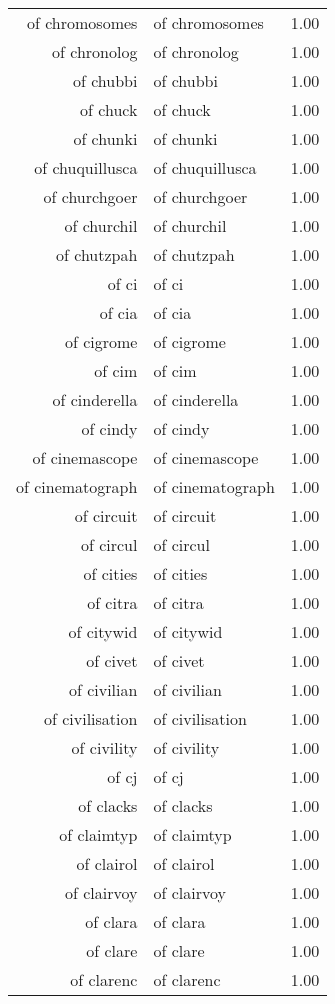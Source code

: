 \begin{table}[ht]
\begin{tabular}{rlr}
  of chromosomes & of chromosomes & 1.00 \\ 
  of chronolog & of chronolog & 1.00 \\ 
  of chubbi & of chubbi & 1.00 \\ 
  of chuck & of chuck & 1.00 \\ 
  of chunki & of chunki & 1.00 \\ 
  of chuquillusca & of chuquillusca & 1.00 \\ 
  of churchgoer & of churchgoer & 1.00 \\ 
  of churchil & of churchil & 1.00 \\ 
  of chutzpah & of chutzpah & 1.00 \\ 
  of ci & of ci & 1.00 \\ 
  of cia & of cia & 1.00 \\ 
  of cigrome & of cigrome & 1.00 \\ 
  of cim & of cim & 1.00 \\ 
  of cinderella & of cinderella & 1.00 \\ 
  of cindy & of cindy & 1.00 \\ 
  of cinemascope & of cinemascope & 1.00 \\ 
  of cinematograph & of cinematograph & 1.00 \\ 
  of circuit & of circuit & 1.00 \\ 
  of circul & of circul & 1.00 \\ 
  of cities & of cities & 1.00 \\ 
  of citra & of citra & 1.00 \\ 
  of citywid & of citywid & 1.00 \\ 
  of civet & of civet & 1.00 \\ 
  of civilian & of civilian & 1.00 \\ 
  of civilisation & of civilisation & 1.00 \\ 
  of civility & of civility & 1.00 \\ 
  of cj & of cj & 1.00 \\ 
  of clacks & of clacks & 1.00 \\ 
  of claimtyp & of claimtyp & 1.00 \\ 
  of clairol & of clairol & 1.00 \\ 
  of clairvoy & of clairvoy & 1.00 \\ 
  of clara & of clara & 1.00 \\ 
  of clare & of clare & 1.00 \\ 
  of clarenc & of clarenc & 1.00 \\ 

\end{tabular}
\end{table}
